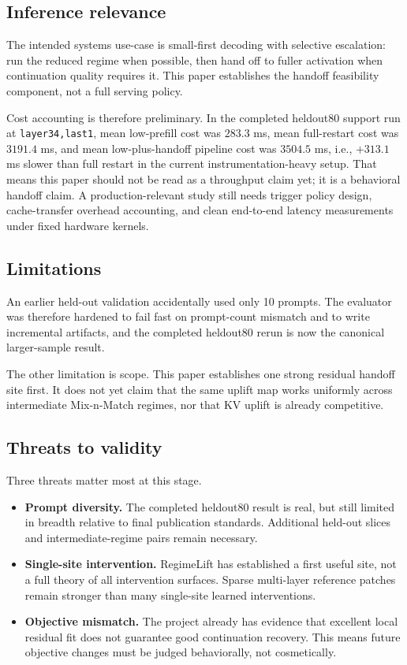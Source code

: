 \documentclass[11pt]{article}
\newcommand{\method}[1]{\texttt{#1}}
\begin{document}
\subsection{Inference relevance}
The intended systems use-case is small-first decoding with selective escalation: run the reduced regime when possible, then hand off to fuller activation when continuation quality requires it. This paper establishes the handoff feasibility component, not a full serving policy.

Cost accounting is therefore preliminary. In the completed heldout80 support run at \method{layer34,last1}, mean low-prefill cost was $283.3$ ms, mean full-restart cost was $3191.4$ ms, and mean low-plus-handoff pipeline cost was $3504.5$ ms, i.e., $+313.1$ ms slower than full restart in the current instrumentation-heavy setup. That means this paper should not be read as a throughput claim yet; it is a behavioral handoff claim. A production-relevant study still needs trigger policy design, cache-transfer overhead accounting, and clean end-to-end latency measurements under fixed hardware kernels.

\subsection{Limitations}
An earlier held-out validation accidentally used only 10 prompts. The evaluator was therefore hardened to fail fast on prompt-count mismatch and to write incremental artifacts, and the completed heldout80 rerun is now the canonical larger-sample result.

The other limitation is scope. This paper establishes one strong residual handoff site first. It does not yet claim that the same uplift map works uniformly across intermediate Mix-n-Match regimes, nor that KV uplift is already competitive.

\subsection{Threats to validity}
Three threats matter most at this stage.
\begin{itemize}[leftmargin=1.4em]
    \item \textbf{Prompt diversity.} The completed heldout80 result is real, but still limited in breadth relative to final publication standards. Additional held-out slices and intermediate-regime pairs remain necessary.
    \item \textbf{Single-site intervention.} RegimeLift has established a first useful site, not a full theory of all intervention surfaces. Sparse multi-layer reference patches remain stronger than many single-site learned interventions.
    \item \textbf{Objective mismatch.} The project already has evidence that excellent local residual fit does not guarantee good continuation recovery. This means future objective changes must be judged behaviorally, not cosmetically.
\end{itemize}
\end{document}
